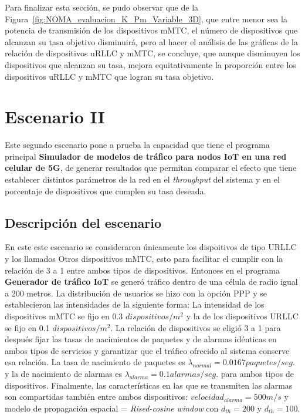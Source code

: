 Para finalizar esta sección, se pudo observar que de la Figura~\ref{fig:NOMA_evaluacion_K_Pm_Variable_3D}, que entre menor sea la potencia de transmisión de los dispositivos mMTC, el número de dispositivos que alcanzan su tasa objetivo disminuirá, pero al hacer el análisis de las gráficas de la relación de dispositivos uRLLC y mMTC, se concluye, que aunque disminuyen los dispositivos que alcanzan su tasa, mejora equitativamente la proporción entre los dispositivos uRLLC y mMTC que logran su tasa objetivo.

\break

\section{Escenario II} %

Este segundo escenario pone a prueba la capacidad que tiene el programa principal \textbf{Simulador de modelos de tráfico para nodos IoT en una red celular de 5G}, de generar resultados que permitan comparar el efecto que tiene establecer distintos parámetros de la red en el \textit{throughput} del sistema y en el porcentaje de dispositivos que cumplen su tasa deseada. \newline

\subsection{Descripción del escenario}

En este este escenario se consideraron únicamente los dispoitivos de tipo URLLC y los llamados Otros dispositivos mMTC, esto para facilitar el cumplir con la relación de 3 a 1 entre ambos tipos de dispositivos. Entonces en el programa \textbf{Generador de tráfico IoT} se generó tráfico dentro de una célula de radio igual a 200 metros. La distribución de usuarios se hizo con la opción PPP y se establecieron las intensidades de la siguiente forma: La intensidad de los dispositivos mMTC se fijo en 0.3 $dispositivos/m^2$ y la de los dispositivos URLLC se fijo en 0.1 $dispositivos/m^2$. La relación de dispositivos se eligió 3 a 1 para después fijar las tasas de nacimientos de paquetes y de alarmas idénticas en ambos tipos de servicios y garantizar que el tráfico ofrecido al sistema conserve esa relación. La tasa de nacimiento de paquetes es $\lambda_{normal} = 0.0167 paquetes/seg.$ y la de nacimiento de alarmas es $\lambda_{alarma} = 0.1 alarmas/seg.$ para ambos tipos de dispositivos. Finalmente, las características en las que se transmiten las alarmas son compartidas también entre ambos dispositivos: $velocidad_{alarma} = 500 m/s$ y modelo de propagación espacial = \textit{Rised-cosine window} con $d_{th}=200$ y $d_{th}=100$. \newline

